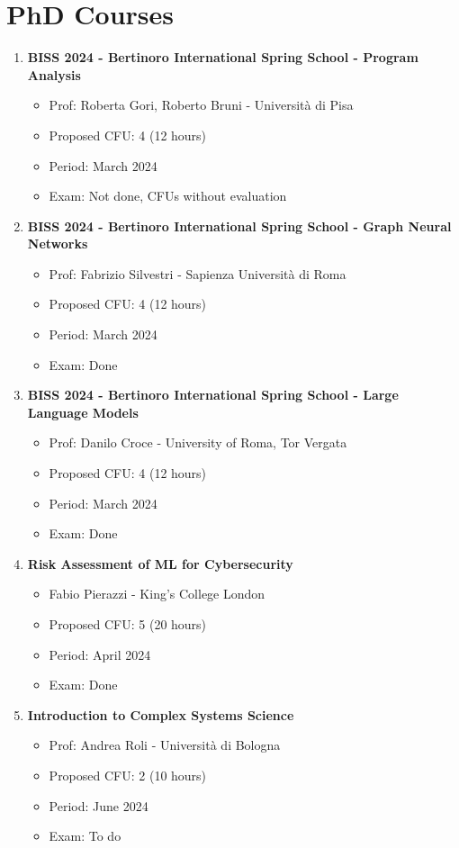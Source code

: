 \documentclass[runningheads]{llncs}
\begin{document}
\section{PhD Courses}

\begin{enumerate}
    \item \textbf{BISS 2024 - Bertinoro International Spring School - Program Analysis}
    \begin{itemize}
        \item Prof: Roberta Gori, Roberto Bruni  - Università di Pisa
        \item Proposed CFU: 4 (12 hours) 
        \item Period: March 2024
        \item Exam: Not done, CFUs without evaluation
    \end{itemize}    
    \item \textbf{BISS 2024 - Bertinoro International Spring School - Graph Neural Networks}
    \begin{itemize}
        \item Prof: Fabrizio Silvestri - Sapienza Università di Roma
        \item Proposed CFU: 4 (12 hours) 
        \item Period: March 2024
        \item Exam: Done
    \end{itemize}  
    \item \textbf{BISS 2024 - Bertinoro International Spring School - Large Language Models}
    \begin{itemize}
        \item Prof: Danilo Croce - University of Roma, Tor Vergata
        \item Proposed CFU: 4 (12 hours) 
        \item Period: March 2024
        \item Exam: Done
    \end{itemize}  
    \item \textbf{Risk Assessment of ML for Cybersecurity}
    \begin{itemize}
        \item Fabio Pierazzi - King's College London
        \item Proposed CFU: 5 (20 hours) 
        \item Period: April 2024
        \item Exam: Done
    \end{itemize}    
    \item \textbf{Introduction to Complex Systems Science} 
    \begin{itemize}
        \item Prof: Andrea Roli - Università di Bologna      
        \item Proposed CFU: 2 (10 hours) 
        \item Period: June 2024
        \item Exam: To do
    \end{itemize}    
    
\end{enumerate}
\end{document}
